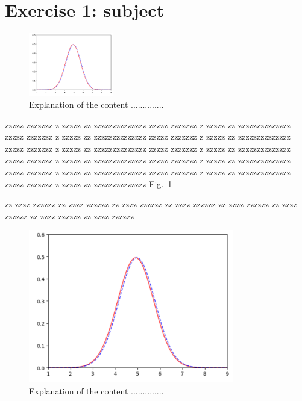 \chapter*{Exercise 1: subject}

\begin{figure}
  \centering
  \includegraphics[width=0.33\textwidth]{./FIG/Gaussiane.png}
\caption{Explanation of the content ..............}
\label{fig:1.1}
\end{figure}

zzzzz zzzzzzz z zzzzz zz zzzzzzzzzzzzzz
zzzzz zzzzzzz z zzzzz zz zzzzzzzzzzzzzz
zzzzz zzzzzzz z zzzzz zz zzzzzzzzzzzzzz
zzzzz zzzzzzz z zzzzz zz zzzzzzzzzzzzzz
zzzzz zzzzzzz z zzzzz zz zzzzzzzzzzzzzz
zzzzz zzzzzzz z zzzzz zz zzzzzzzzzzzzzz
zzzzz zzzzzzz z zzzzz zz zzzzzzzzzzzzzz
zzzzz zzzzzzz z zzzzz zz zzzzzzzzzzzzzz
zzzzz zzzzzzz z zzzzz zz zzzzzzzzzzzzzz
zzzzz zzzzzzz z zzzzz zz zzzzzzzzzzzzzz
zzzzz zzzzzzz z zzzzz zz zzzzzzzzzzzzzz Fig.~\ref{fig:1.1}

zz zzzz zzzzzz 
zz zzzz zzzzzz
zz zzzz zzzzzz
zz zzzz zzzzzz
zz zzzz zzzzzz
zz zzzz zzzzzz
zz zzzz zzzzzz
zz zzzz zzzzzz


\begin{figure}[b!]
\centering
\includegraphics[width=0.8\textwidth]{./FIG/Gaussiane.png}
\caption{Explanation of the content ..............}
\label{fig:1.2}
\end{figure}

